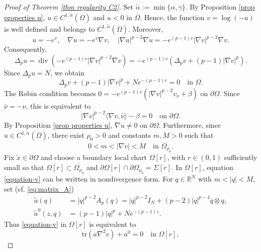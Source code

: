\documentclass[10pt,a4paper]{amsart}
\numberwithin{equation}{section}
\newcommand{\R}{\mathbb{R}}
\renewcommand{\div}{\operatorname{div}}
\begin{document}
\begin{proof}[Proof of Theorem \ref{thm regularity C2}]
Set $\tilde{\alpha}:= \min\{ \alpha, \gamma\}$. By Proposition \ref{prop properties u}, $u \in C^{1,\tilde{\alpha}}(\overline\Omega)$ and $u<0$ in $\overline\Omega$. Hence, the function $v=\log(-u)$ is well defined and belongs to $C^{1,\tilde{\alpha}}(\overline\Omega)$. Moreover,
\[
    u=-e^v,\quad\nabla u=-e^v\nabla v,\quad|\nabla u|^{p-2}\nabla u=-e^{(p-1)v}|\nabla v|^{p-2}\nabla v.
\]
Consequently,
\begin{equation*}
    \Delta_p u =\div\left(-e^{(p-1)v}|\nabla v|^{p-2}\nabla v\right)=-e^{(p-1)v}\left(\Delta_p v+(p-1)|\nabla v|^p\right).
\end{equation*}
Since $\Delta_p u=N$, we obtain
\begin{equation}\label{equation-v}
    \Delta_p v+(p-1)|\nabla v|^p+N e^{-(p-1)v}=0\quad\text{in }\Omega.
\end{equation}
The Robin condition becomes $0=-e^{(p-1)v}\left(|\nabla v|^{p-2}v_\nu+\beta\right)$ on $\partial\Omega$.
Since $\bar{\nu}=-\nu$, this is equivalent to
\begin{equation}\label{boundary-v}
    |\nabla v|^{p-2}\langle\nabla v,\bar{\nu} \rangle-\beta=0\quad\text{on }\partial\Omega.
\end{equation}
By Proposition \ref{prop properties u}, $\nabla u \neq 0$ on $\partial\Omega$. Furthermore, since $u\in C^{1,\tilde{\alpha}}(\overline\Omega)$, there exist $\rho_0>0$ and constants $m,M>0$ such that
\begin{equation}\label{nablav-bounds}
    0<m<|\nabla v|<M\quad\text{in }\overline{\Omega_{\rho_0}}.
\end{equation}
Fix $\tilde{x}\in\partial\Omega$ and choose a boundary local chart $\Omega[r]$, with $r \in (0,1)$ sufficiently small so that $\overline{\Omega[r]} \subset \overline{\Omega_{\rho_0}}$ and $\partial \Omega[r] \cap \partial \Omega_{\rho_0} = \Sigma[r]$.
In $\Omega[r]$, equation \eqref{equation-v} can be written in nondivergence form. For $q\in\R^N$ with $m<|q|<M$, set (cf. \eqref{eq:matrix_A})
\begin{align*}
    \tilde{a}(q)&= |q|^{p-2} A_p(q) = |q|^{p-2} I_N +(p-2)|q|^{p-4} q \otimes q,\\
    \tilde{a}^0(z,q)&=(p-1)|q|^p+N e^{-(p-1)z}.
\end{align*}
Thus \eqref{equation-v} in $\Omega[r]$ is equivalent to
\begin{equation}\label{eq-nondiv}
    \mathrm{tr} (a \nabla^2 v) + a^0=0 \quad\text{in }\Omega[r],

\end{equation}
\end{proof}
\end{document}
